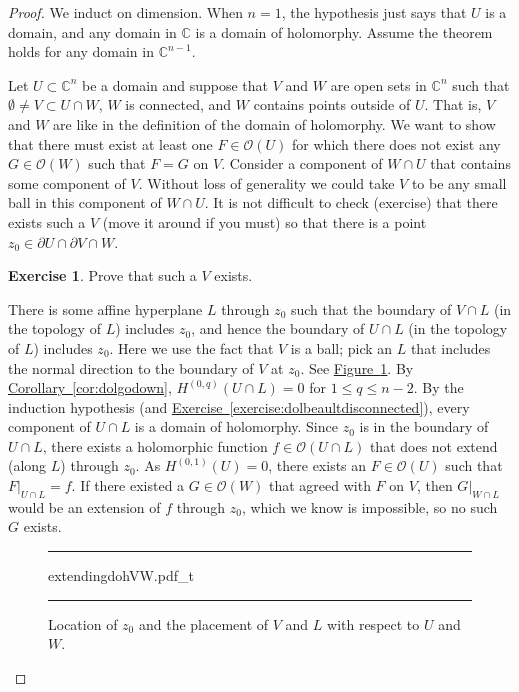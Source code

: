 \documentclass[12pt,openany]{book}
\newcommand{\C}{{\mathbb{C}}}
\newcommand{\sO}{{\mathscr{O}}}
\theoremstyle{plain}
\theoremstyle{remark}
\theoremstyle{definition}
\newenvironment{exbox}{%
    \def\FrameCommand{\vrule width 1pt \relax\hspace{10pt}}%
    \MakeFramed{\advance\hsize-\width\FrameRestore}%
}{%
    \endMakeFramed
}
\newenvironment{myfig}{%
\begin{figure}[h!t]
\noindent\rule{\textwidth}{0.5pt}\vspace{12pt}\par\centering}%
{\par\noindent\rule{\textwidth}{0.5pt}
\end{figure}}
\theoremstyle{exercise}
\newtheorem{exercise}{Exercise}[section]
\theoremstyle{example}
\newcommand{\figureref}[1]{\hyperref[#1]{Figure~\ref*{#1}}}
\newcommand{\exerciseref}[1]{\hyperref[#1]{Exercise~\ref*{#1}}}
\newcommand{\corref}[1]{\hyperref[#1]{Corollary~\ref*{#1}}}
\begin{document}
\begin{proof}
We induct on dimension.  When $n=1$, the hypothesis just says that
$U$ is a domain, and any domain in $\C$ is a domain of holomorphy.
Assume the theorem holds for any domain in $\C^{n-1}$.

Let $U \subset \C^n$ be a domain and
suppose that $V$ and $W$ are open sets in $\C^n$
such that $\emptyset \neq V \subset U \cap W$, $W$ is connected, and $W$ contains points outside
of $U$.  That is, $V$ and $W$ are like in the definition of the domain of
holomorphy.  We want to show that there must exist at least one $F \in
\sO(U)$ for which there does not exist any $G \in \sO(W)$ such that $F=G$ on
$V$.
Consider a component of $W \cap U$ that contains some component of $V$.
Without loss of generality we could take $V$ to be any small ball in this
component of $W \cap U$.
It is not difficult to check (exercise) that there exists such a $V$
(move it around if you must)
so that there is a point $z_0 \in \partial U \cap \partial V \cap W$.

\begin{exbox}
\begin{exercise}
Prove that such a $V$ exists.
\end{exercise}
\end{exbox}

There is some affine hyperplane $L$ through $z_0$ such that
the boundary of $V \cap L$ (in the topology of $L$) includes $z_0$,
and hence the boundary of $U \cap L$ (in the topology of $L$)
includes $z_0$.
Here we use the fact that $V$ is a ball; pick an $L$ that includes the
normal direction to the boundary of $V$ at $z_0$.  See
\figureref{fig:extendingdohVW}.
By \corref{cor:dolgodown},
$H^{(0,q)}(U \cap L) = 0$ for $1 \leq q \leq n-2$.
By the induction hypothesis
(and \exerciseref{exercise:dolbeaultdisconnected}),
every component of $U \cap L$ is a domain of holomorphy.
Since $z_0$ is in the boundary of $U \cap L$, there exists a holomorphic function
$f \in \sO(U \cap L)$ that does not extend (along $L$) through $z_0$.
As $H^{(0,1)}(U) = 0$, there exists an $F \in \sO(U)$
such that $F|_{U \cap L} = f$.  If there existed a $G \in \sO(W)$ that
agreed with $F$ on $V$, then $G|_{W \cap L}$ would be an extension of $f$
through $z_0$, which we know is impossible, so no such $G$ exists.
\begin{myfig}
{extendingdohVW.pdf_t}
\caption{Location of $z_0$ and the placement of $V$ and $L$ with
respect to $U$ and $W$.\label{fig:extendingdohVW}}
\end{myfig}
\end{proof}
\end{document}
